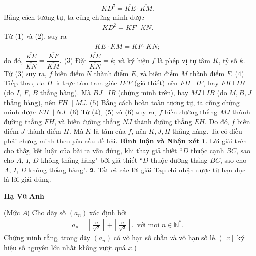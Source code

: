 \begin{multicols}{2}
\begin{align*}
		K{D^2} = \overline {KE}  \cdot \overline {KM} . \tag{$1$}
	\end{align*}
	Bằng cách tương tự, ta cũng chứng minh được
	\begin{align*}
		K{D^2} = \overline {KF}  \cdot \overline {KN} . \tag{$2$}
	\end{align*}
	Từ ($1$) và ($2$), suy ra
	\begin{align*}
		\overline {KE}  \cdot \overline {KM}  = \overline {KF}  \cdot \overline {KN} ;
	\end{align*}
	do đó, $\dfrac{{\overline {KE} }}{{\overline {KN} }} = \dfrac{{\overline {KF} }}{{\overline {KM} }}.$ \hfill ($3$)
	\vskip 0.05cm
	Đặt $\dfrac{{\overline {KE} }}{{\overline {KN} }} = k$;  và ký hiệu $f$ là phép vị tự tâm $K$, tỷ số $k$.
	\vskip 0.05cm
	Từ ($3$) suy ra, $f$ biến điểm $N$ thành điểm $E$, và biến điểm $M$ thành điểm $F$. \hfill ($4$)
	\vskip 0.05cm
	Tiếp theo, do $H$ là trực tâm tam giác $IEF$ (giả thiết) nên $FH \bot IE$, hay $FH \bot IB$ (do $I$, $E$, $B$ thẳng hàng). Mà $BJ \bot IB$ (chứng minh trên), hay $MJ \bot IB$ (do $M, B, J$ thẳng hàng), nên $FH \parallel MJ$.   \hfill     ($5$)
	\vskip 0.05cm
	Bằng cách hoàn toàn tương tự, ta cũng chứng minh được $EH \parallel NJ$.  \hfill   ($6$)
	\vskip 0.05cm
	Từ ($4$), ($5$) và ($6$) suy ra, $f$ biến đường thẳng $MJ$ thành đường thẳng $FH$, và biến đường thẳng $NJ$ thành đường thẳng $EH$. Do đó, $f$ biến điểm $J$ thành điểm $H$. Mà $K$ là tâm của $f$, nên $K, J, H$ thẳng hàng. Ta có điều phải chứng minh theo yêu cầu đề bài.
	\vskip 0.05cm
	\textbf{\color{thachthuctoanhoc}Bình luận và Nhận xét}
	\vskip 0.05cm
	$\pmb{1.}$ Lời giải trên cho thấy, kết luận của bài ra vẫn đúng, khi thay giả thiết ``$D$ thuộc cạnh $BC$, sao cho $A$, $I$, $D$ không thẳng hàng" bởi giả thiết ``$D$ thuộc đường thẳng $BC$, sao cho $A$, $I$, $D$ không thẳng hàng".
	\vskip 0.05cm
	$\pmb{2.}$ Tất cả các lời giải Tạp chí nhận được từ bạn đọc là lời giải đúng.
	\begin{flushright}
		\textbf{\color{thachthuctoanhoc}Hạ Vũ Anh}
	\end{flushright}
	{}
	(Mức $A$) Cho dãy số $\left(a_n\right)$  xác định bởi
	\begin{align*}
		{a_n} = \left\lfloor {\frac{n}{{\sqrt 2 }}} \right\rfloor  + \left\lfloor {\frac{n}{{\sqrt 3 }}} \right\rfloor , \text{ với mọi } n \in \mathbb{N^*}.
	\end{align*}
	Chứng minh rằng, trong dãy $\left(a_n\right)$  có vô hạn số chẵn và vô hạn số lẻ.
	\vskip 0.1cm
	($\left\lfloor x \right\rfloor $  ký hiệu số nguyên lớn nhất không vượt quá $x$.)

\end{multicols}
